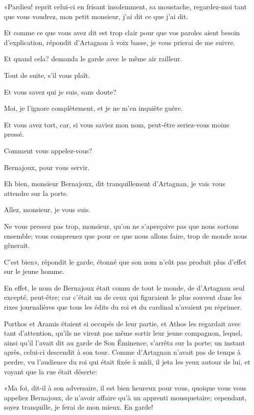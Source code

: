«Pardieu! reprit celui-ci en frisant insolemment, sa moustache, regardez-moi tant que vous voudrez, mon petit monsieur, j'ai dit ce que j'ai dit. 

\speak  Et comme ce que vous avez dit est trop clair pour que vos paroles aient besoin d'explication, répondit d'Artagnan à voix basse, je vous prierai de me suivre. 

\speak  Et quand cela? demanda le garde avec le même air railleur. 

\speak  Tout de suite, s'il vous plaît. 

\speak  Et vous savez qui je suis, sans doute? 

\speak Moi, je l'ignore complètement, et je ne m'en inquiète guère. 

\speak  Et vous avez tort, car, si vous saviez mon nom, peut-être seriez-vous moins pressé. 

\speak  Comment vous appelez-vous? 

\speak  Bernajoux, pour vous servir. 

\speak  Eh bien, monsieur Bernajoux, dit tranquillement d'Artagnan, je vais vous attendre sur la porte. 

\speak  Allez, monsieur, je vous suis. 

\speak  Ne vous pressez pas trop, monsieur, qu'on ne s'aperçoive pas que nous sortons ensemble; vous comprenez que pour ce que nous allons faire, trop de monde nous gênerait. 

\speak  C'est bien», répondit le garde, étonné que son nom n'eût pas produit plus d'effet sur le jeune homme. 

En effet, le nom de Bernajoux était connu de tout le monde, de d'Artagnan seul excepté, peut-être; car c'était un de ceux qui figuraient le plus souvent dans les rixes journalières que tous les édits du roi et du cardinal n'avaient pu réprimer. 

Porthos et Aramis étaient si occupés de leur partie, et Athos les regardait avec tant d'attention, qu'ils ne virent pas même sortir leur jeune compagnon, lequel, ainsi qu'il l'avait dit au garde de Son Éminence, s'arrêta sur la porte; un instant après, celui-ci descendit à son tour. Comme d'Artagnan n'avait pas de temps à perdre, vu l'audience du roi qui était fixée à midi, il jeta les yeux autour de lui, et voyant que la rue était déserte: 

«Ma foi, dit-il à son adversaire, il est bien heureux pour vous, quoique vous vous appeliez Bernajoux, de n'avoir affaire qu'à un apprenti mousquetaire; cependant, soyez tranquille, je ferai de mon mieux. En garde! 

